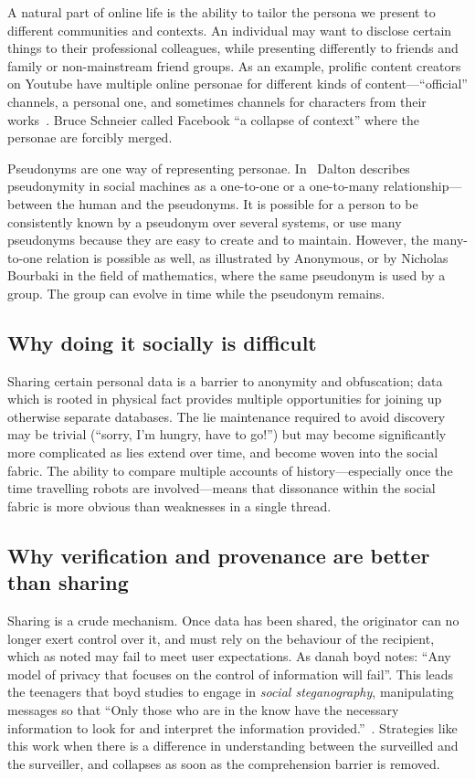 \documentclass{IOS-Book-Article}     %
\begin{document}
A natural part of online life is the ability to tailor the persona we present to
different communities and contexts. An individual may want to disclose certain
things to their professional colleagues, while presenting differently to friends
and family or non-mainstream friend groups. 
As an example, prolific content creators on Youtube have multiple online
personae for different kinds of content---``official'' channels, a personal one,
and sometimes channels for characters from their works~\cite{guy2014ConstructedIdentity}.
Bruce Schneier called Facebook ``a collapse of context'' where the personae are
forcibly merged.

Pseudonyms are one way of representing personae. In~\cite{dalton2013Pseudonymity} Dalton describes pseudonymity in social machines as
a one-to-one or a one-to-many relationship---between the human and the
pseudonyms. It is possible for a person to be consistently known by a pseudonym
over several systems, or use many pseudonyms because they are easy to create and
to maintain. However, the many-to-one relation is possible as well, as
illustrated by Anonymous, or by Nicholas Bourbaki in the field of mathematics,
where the same pseudonym is used by a group. The group can evolve in time while
the pseudonym remains. 

\subsection{Why doing it socially is difficult}

Sharing certain personal data is a barrier to anonymity and obfuscation; 
data which is rooted in physical fact provides multiple opportunities for
joining up otherwise separate databases. 
The lie maintenance required to avoid discovery may be trivial (``sorry, I'm hungry,
have to go!'') but may become significantly more complicated as lies extend over
time, and become woven into the social fabric. The ability to compare
multiple accounts of history---especially once the time travelling
robots are involved---means that dissonance within the social
fabric is more obvious than weaknesses in a single thread.




\subsection*{Why verification and provenance are better than sharing}

Sharing is a crude mechanism. Once data has been shared, the originator can no
longer exert control over it, and must rely on the behaviour of the recipient,
which as noted may fail to meet user expectations. As danah boyd
notes: ``Any model of privacy that focuses on the control of information will
fail''. This leads the teenagers that boyd studies to
engage in \emph{social steganography}, manipulating messages so that ``Only 
those who are in the know have the necessary information to look for and interpret the information 
provided.''~\cite{boyd2012Networked}. Strategies like this work when there is a
difference in understanding between the surveilled and the surveiller, and
collapses as soon as the comprehension barrier is removed.
\end{document}
